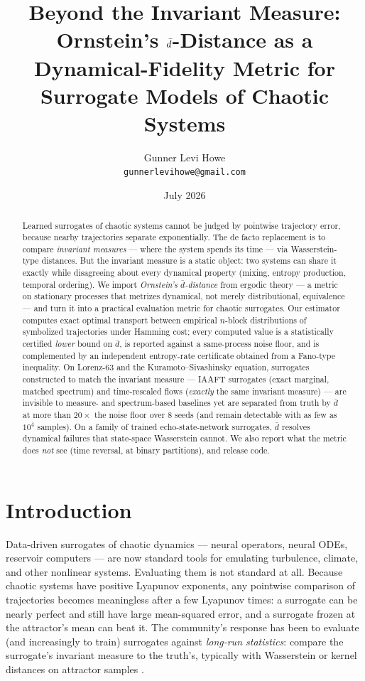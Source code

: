 \documentclass[11pt]{article}
\title{Beyond the Invariant Measure: Ornstein's $\dbar$-Distance as a\\
Dynamical-Fidelity Metric for Surrogate Models of Chaotic Systems}
\author{Gunner Levi Howe\\
\small\texttt{gunnerlevihowe@gmail.com}}
\date{July 2026}
\newcommand{\dbar}{\bar d}
\begin{document}
\maketitle

\begin{abstract}
Learned surrogates of chaotic systems cannot be judged by pointwise trajectory error,
because nearby trajectories separate exponentially. The de facto replacement is to
compare \emph{invariant measures} --- where the system spends its time --- via
Wasserstein-type distances. But the invariant measure is a static object: two systems
can share it exactly while disagreeing about every dynamical property (mixing, entropy
production, temporal ordering). We import \emph{Ornstein's $\dbar$-distance} from
ergodic theory --- a metric on stationary processes that metrizes dynamical, not merely
distributional, equivalence --- and turn it into a practical evaluation metric for
chaotic surrogates. Our estimator computes exact optimal transport between empirical
$n$-block distributions of symbolized trajectories under Hamming cost; every computed
value is a statistically certified \emph{lower} bound on $\dbar$, is reported against a
same-process noise floor, and is complemented by an independent entropy-rate certificate
obtained from a Fano-type inequality. On Lorenz-63 and the Kuramoto--Sivashinsky
equation, surrogates constructed to match the invariant measure --- IAAFT surrogates
(exact marginal, matched spectrum) and time-rescaled flows (\emph{exactly} the same
invariant measure) --- are invisible to measure- and spectrum-based baselines yet are
separated from truth by $\dbar$ at more than $20\times$ the noise floor over 8 seeds
(and remain detectable with as few as $10^4$ samples). On a family of trained
echo-state-network surrogates, $\dbar$ resolves
dynamical failures that state-space Wasserstein cannot. We also report what the metric
does \emph{not} see (time reversal, at binary partitions), and release code.
\end{abstract}

\section{Introduction}\label{sec:intro}

Data-driven surrogates of chaotic dynamics --- neural operators, neural ODEs, reservoir
computers --- are now standard tools for emulating turbulence, climate, and other
nonlinear systems. Evaluating them is not standard at all. Because chaotic systems have
positive Lyapunov exponents, any pointwise comparison of trajectories becomes
meaningless after a few Lyapunov times: a surrogate can be nearly perfect and still have
large mean-squared error, and a surrogate frozen at the attractor's mean can beat it.
The community's response has been to evaluate (and increasingly to train)
surrogates against \emph{long-run statistics}: compare the surrogate's invariant measure
to the truth's, typically with Wasserstein or kernel distances on attractor samples
\citep{schiff2024dyslim,jiang2023training,melo2026learning,fumagalli2025data}.
\end{document}
